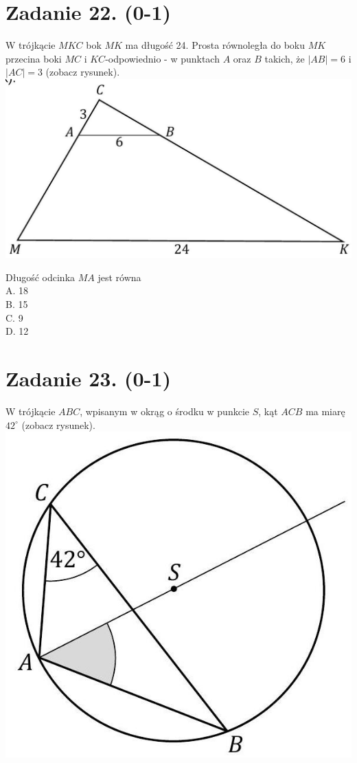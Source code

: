 \documentclass[10pt]{article}
\begin{document}
\section*{Zadanie 22. (0-1)}
W trójkącie \(M K C\) bok \(M K\) ma długość 24. Prosta równoległa do boku \(M K\) przecina boki \(M C\) i \(K C\)-odpowiednio - w punktach \(A\) oraz \(B\) takich, że \(|A B|=6\) i \(|A C|=3\) (zobacz rysunek).\\
\includegraphics[max width=\textwidth, center]{2024_11_21_0a35d272448d5080a489g-16(1)}

Długość odcinka \(M A\) jest równa\\
A. 18\\
B. 15\\
C. 9\\
D. 12

\section*{Zadanie 23. (0-1)}
W trójkącie \(A B C\), wpisanym w okrąg o środku w punkcie \(S\), kąt \(A C B\) ma miarę \(42^{\circ}\) (zobacz rysunek).\\
\includegraphics[max width=\textwidth, center]{2024_11_21_0a35d272448d5080a489g-16}
\end{document}
